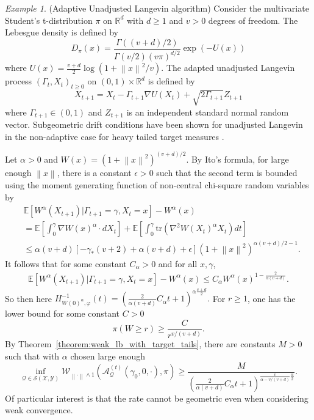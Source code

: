 \documentclass[12pt]{article}
\theoremstyle{plain}
\theoremstyle{remark}
\newtheorem{example}[theorem]{Example}
\newcommand{\norm}[1]{\left\lVert#1\right\rVert}
\newcommand{\e}{\epsilon}
\newcommand{\tr}{\text{tr}}
\newcommand{\R}{\mathbb{R}}
\newcommand{\Q}{\mathcal{Q}}
\newcommand{\E}{\mathbb{E}}
\newcommand{\W}{\mathcal{W}}
\newcommand{\A}{\mathcal{A}}
\newcommand{\X}{\mathcal{X}}
\newcommand{\Y}{\mathcal{Y}}
\renewcommand{\S}{\mathcal{S}}
\let\temp\phi
\let\phi\varphi
\let\varphi\temp
\newcommand{\eq}[1]{\begin{align*}#1\end{align*}}
\begin{document}
\begin{example} 
\label{section:ula}
(Adaptive Unadjusted Langevin algorithm)
Consider the multivariate Student's t-distribution $\pi$ on $\R^d$ with $d \ge 1$ and $v > 0$ degrees of freedom. The Lebesgue density is defined by
\[
D_{\pi}(x)
= \frac{\Gamma( (v + d)/2 )}{\Gamma(v/2) (v \pi)^{d/2}} 
\exp(-U(x))
\]
where $U(x) = \frac{v + d}{2} \log( 1 + \norm{x}^2 / v )$. 
The adapted unadjusted Langevin process $(\Gamma_t, X_t)_{t \ge 0}$ on $(0, 1) \times \R^d$ is defined by
\[
X_{t + 1}
= X_t - \Gamma_{t+1} \nabla U(X_t) + \sqrt{ 2 \Gamma_{t+1} } Z_{t + 1}
\]
where $\Gamma_{t+1} \in (0, 1)$ and $Z_{t + 1}$ is an independent standard normal random vector.
Subgeometric drift conditions have been shown for unadjusted Langevin in the non-adaptive case for heavy tailed target measures \citep{kamatani:2009}.

Let $\alpha > 0$ and $W(x) = (1 + \norm{x}^2)^{(v + d)/2}$.
By Ito's formula, for large enough $\norm{x}$, there is a constant $\e > 0$ such that the second term is bounded using the moment generating function of non-central chi-square random variables by
\eq{
&\E\left[ W^\alpha(X_{t + 1}) | \Gamma_{t + 1} = \gamma, X_t = x \right] - W^\alpha(x)
\\
&= \E\left[ 
\int_{0}^\gamma \nabla W(x)^\alpha \cdot dX_t
\right]
+ \E\left[ 
\int_{0}^\gamma \tr\left( \nabla^2 W(X_t)^\alpha X_t \right) dt
\right]
\\
&\le 
 \alpha ( v + d )  \left[ - \gamma_* (v + 2) + \alpha ( v + d ) + \e \right]
\left( 1 + \norm{x}^2 \right)^{\alpha(v + d)/2 - 1}.
}
It follows that for some constant $C_\alpha > 0$ and for all $x, \gamma$,
\eq{
\E\left[ W^\alpha(X_{t + 1}) | \Gamma_{t + 1} = \gamma, X_t = x \right] - W^\alpha(x)
\le 
C_{\alpha}
W^\alpha(x)^{1 - \frac{2}{\alpha (v + d)}}.
}
So then here
$
H^{-1}_{W(0)^{\alpha}, \phi}(t) = \left( \frac{2}{\alpha (v + d)} C_\alpha t + 1 \right)^{\alpha \frac{v + d}{2}}.
$
For $r \ge 1$, one has the lower bound for some constant $C > 0$
\[
\pi(  W \ge r )
\ge \frac{C}{r^{v/(v + d)}}.
\]
By Theorem~\ref{theorem:weak_lb_with_target_tails}, there are constants $M > 0$ such that with $\alpha$ chosen large enough
\[
\inf_{\Q \in \S(\X, \Y) } \W_{\norm{\cdot} \wedge 1}( \A_{\Q}^{(t)}(\gamma_0, 0, \cdot), \pi)
\ge \frac{M}{ \left( \frac{2}{\alpha (v + d)} C_\alpha t + 1 \right)^{ \frac{v}{\alpha - v/(v + d)} \frac{\alpha}{2}} }.
\]
Of particular interest is that the rate cannot be geometric even when considering weak convergence.
\end{example}
\end{document}
